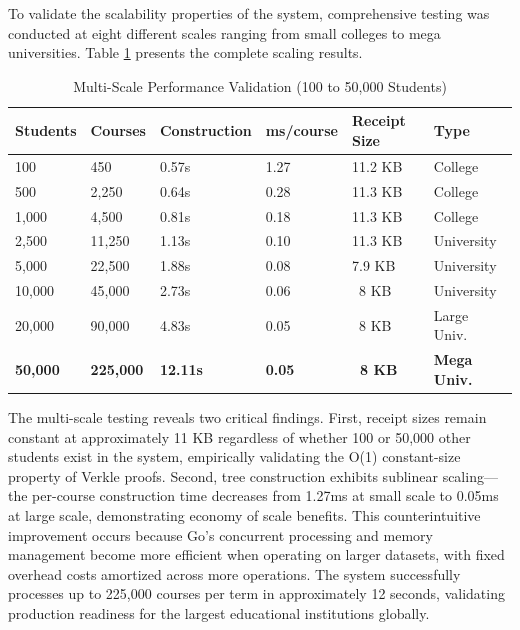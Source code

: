 To validate the scalability properties of the system, comprehensive testing was conducted at eight different scales ranging from small colleges to mega universities. Table \ref{tab:multi-scale} presents the complete scaling results.

\begin{table}[H]
\centering
\caption{Multi-Scale Performance Validation (100 to 50,000 Students)}
\label{tab:multi-scale}
\small
\begin{tabular}{|p{2cm}|p{2cm}|p{2.2cm}|p{2.2cm}|p{2.2cm}|p{2cm}|}
\hline
\textbf{Students} & \textbf{Courses} & \textbf{Construction} & \textbf{ms/course} & \textbf{Receipt Size} & \textbf{Type} \\
\hline
100 & 450 & 0.57s & 1.27 & 11.2 KB & College \\
\hline
500 & 2,250 & 0.64s & 0.28 & 11.3 KB & College \\
\hline
1,000 & 4,500 & 0.81s & 0.18 & 11.3 KB & College \\
\hline
2,500 & 11,250 & 1.13s & 0.10 & 11.3 KB & University \\
\hline
5,000 & 22,500 & 1.88s & 0.08 & 7.9 KB & University \\
\hline
10,000 & 45,000 & 2.73s & 0.06 & ~8 KB & University \\
\hline
20,000 & 90,000 & 4.83s & 0.05 & ~8 KB & Large Univ. \\
\hline
\textbf{50,000} & \textbf{225,000} & \textbf{12.11s} & \textbf{0.05} & \textbf{~8 KB} & \textbf{Mega Univ.} \\
\hline
\end{tabular}
\end{table}

The multi-scale testing reveals two critical findings. First, receipt sizes remain constant at approximately 11 KB regardless of whether 100 or 50,000 other students exist in the system, empirically validating the O(1) constant-size property of Verkle proofs. Second, tree construction exhibits sublinear scaling—the per-course construction time decreases from 1.27ms at small scale to 0.05ms at large scale, demonstrating economy of scale benefits. This counterintuitive improvement occurs because Go's concurrent processing and memory management become more efficient when operating on larger datasets, with fixed overhead costs amortized across more operations. The system successfully processes up to 225,000 courses per term in approximately 12 seconds, validating production readiness for the largest educational institutions globally.

